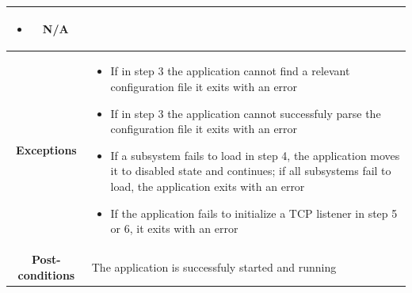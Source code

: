 \documentclass[12pt,a4paper,table]{article}
\begin{document}
\begin{longtable}{ |c|p{11.8cm}| }
{\begin{itemize}
                        \item N/A
                    \end{itemize}
                }\\ \hline
                \cellcolor[gray]{0.9} \textbf{Exceptions} & 
                    \begin{itemize}
                        \item If in step 3 the application cannot find a relevant configuration file it exits with an error
                        \item If in step 3 the application cannot successfuly parse the configuration file it exits with an error
                        \item If a subsystem fails to load in step 4, the application moves it to disabled state and continues; if all subsystems fail to load, the application exits with an error
                        \item If the application fails to initialize a TCP listener in step 5 or 6, it exits with an error
                    \end{itemize}\\ \hline
                \cellcolor[gray]{0.9} \textbf{Post-conditions} & The application is successfuly started and running\\ \hline
            \end{longtable}
\end{document}
